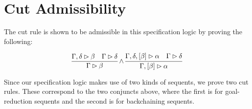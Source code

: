 \section{Cut Admissibility}
\label{sec:cutadmiss}

The cut rule is shown to be admissible in this specification logic by proving the following:

\begin{theorem}
$$
\vcenter{\infer{\seqsl[\dyncon{}]{\beta}}{\seqsl[\dyncon{} , \delta]{\beta} & \seqsl[\dyncon{}]{\delta}}}
\wedge
\vcenter{\infer{\bchsl[\dyncon{}]{\beta}{\alpha}}{\bchsl[\dyncon{} , \delta]{\beta}{\alpha} & \seqsl[\dyncon{}]{\delta}}}
$$
\end{theorem}
\noindent Since our specification logic makes use of two kinds of sequents, we prove two cut rules. These correspond to the two conjuncts above, where the first is for goal-reduction sequents and the second is for backchaining sequents.


